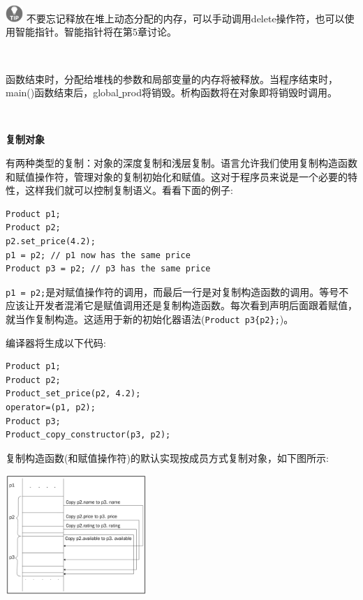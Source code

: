 \hspace*{\fill} \\ %
\includegraphics[width=0.05\textwidth]{images/tip}
不要忘记释放在堆上动态分配的内存，可以手动调用delete操作符，也可以使用智能指针。智能指针将在第5章讨论。 \par
\noindent\textbf{}\ \par

函数结束时，分配给堆栈的参数和局部变量的内存将被释放。当程序结束时，main()函数结束后，global\underline{ }prod将销毁。析构函数将在对象即将销毁时调用。 \par

\noindent\textbf{}\ \par
\textbf{复制对象} \ \par
有两种类型的复制：对象的深度复制和浅层复制。语言允许我们使用复制构造函数和赋值操作符，管理对象的复制初始化和赋值。这对于程序员来说是一个必要的特性，这样我们就可以控制复制语义。看看下面的例子: \par

\begin{lstlisting}[caption={}]
Product p1;
Product p2;
p2.set_price(4.2);
p1 = p2; // p1 now has the same price
Product p3 = p2; // p3 has the same price
\end{lstlisting}

\texttt{p1 = p2;}是对赋值操作符的调用，而最后一行是对复制构造函数的调用。等号不应该让开发者混淆它是赋值调用还是复制构造函数。每次看到声明后面跟着赋值，就当作复制构造。这适用于新的初始化器语法(\texttt{Product p3\{p2\};})。 \par

编译器将生成以下代码: \par

\begin{lstlisting}[caption={}]
Product p1;
Product p2;
Product_set_price(p2, 4.2);
operator=(p1, p2);
Product p3;
Product_copy_constructor(p3, p2);
\end{lstlisting}

复制构造函数(和赋值操作符)的默认实现按成员方式复制对象，如下图所示: \par

\begin{center}
	\includegraphics[width=0.4\textwidth]{content/Section-1/Chapter-3/7}
\end{center}

